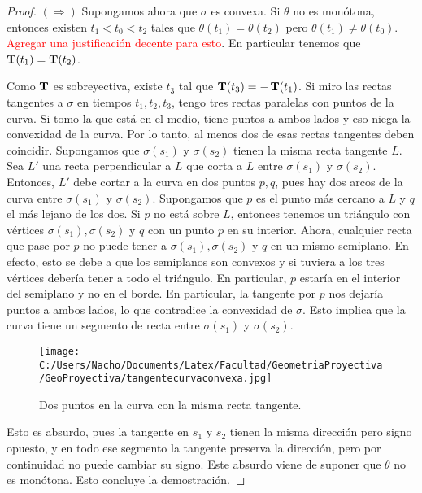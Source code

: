 \begin{teo}
\begin{proof}
$(\Longrightarrow)$ Supongamos ahora que $\sigma$ es convexa. Si $\theta$ no es monótona, entonces existen $t_1<t_0<t_2$ tales que $\theta(t_1)=\theta(t_2)$ pero $\theta(t_1)\neq\theta(t_0)$. \textcolor{red}{Agregar una justificación decente para esto}. En particular tenemos que $\operatorname{\mathbf{T}}(t_1)=\operatorname{\mathbf{T}}(t_2)$.

Como $\operatorname{\mathbf{T}}$ es sobreyectiva, existe $t_3$ tal que $\operatorname{\mathbf{T}}(t_3)=-\operatorname{\mathbf{T}}(t_1)$. Si miro las rectas tangentes a $\sigma$ en tiempos $t_1,t_2,t_3$, tengo tres rectas paralelas con puntos de la curva. Si tomo la que está en el medio, tiene puntos a ambos lados y eso niega la convexidad de la curva. Por lo tanto, al menos dos de esas rectas tangentes deben coincidir. Supongamos que $\sigma(s_1)$ y $\sigma(s_2)$ tienen la misma recta tangente $L$. Sea $L'$ una recta perpendicular a $L$ que corta a $L$ entre $\sigma(s_1)$ y $\sigma(s_2)$. Entonces, $L'$ debe cortar a la curva en dos puntos $p,q$, pues hay dos arcos de la curva entre $\sigma(s_1)$ y $\sigma(s_2)$. Supongamos que $p$ es el punto más cercano a $L$ y $q$ el más lejano de los dos. Si $p$ no está sobre $L$, entonces tenemos un triángulo con vértices $\sigma(s_1),\sigma(s_2)$ y $q$ con un punto $p$ en su interior. Ahora, cualquier recta que pase por $p$ no puede tener a $\sigma(s_1),\sigma(s_2)$ y $q$ en un mismo semiplano. En efecto, esto se debe a que los semiplanos son convexos y si tuviera a los tres vértices debería tener a todo el triángulo. En particular, $p$ estaría en el interior del semiplano y no en el borde. En particular, la tangente por $p$ nos dejaría puntos a ambos lados, lo que contradice la convexidad de $\sigma$. Esto implica que la curva tiene un segmento de recta entre $\sigma(s_1)$ y $\sigma(s_2)$.

\begin{figure}[h]
	\centering
		\texttt{[image: C:/Users/Nacho/Documents/Latex/Facultad/GeometriaProyectiva/GeoProyectiva/tangentecurvaconvexa.jpg]}
	\caption{Dos puntos en la curva con la misma recta tangente.}
	\label{fig:tangentecurvaconvexa}
\end{figure}

Esto es absurdo, pues la tangente en $s_1$ y $s_2$ tienen la misma dirección pero signo opuesto, y en todo ese segmento la tangente preserva la dirección, pero por continuidad no puede cambiar su signo. Este absurdo viene de suponer que $\theta$ no es monótona. Esto concluye la demostración.
\end{proof}
\end{teo}

